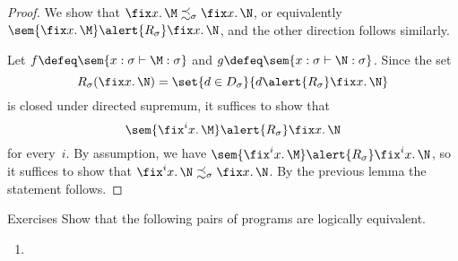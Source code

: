 \begin{frame}
  \begin{proof}
    We show that $\fix x.\, \M \precsim_\sigma \fix x.\, \N$, or
    equivalently~$\sem{\fix x.\, \M} \alert{\mathrel{R_\sigma}} \fix x.\, \N$, and
    the other direction follows similarly. 
    
    Let $f \defeq \sem{x : \sigma \vdash \M : \sigma}$ and $g \defeq \sem{x :
      \sigma \vdash \N : \sigma}$. Since the set
    \[
      R_\sigma(\fix x.\,\N)
      = \set{ d \in D_\sigma}{ d \alert{\mathrel{R_\sigma}} \fix x.\,\N}
    \]
    is closed under directed supremum, it suffices to show that
    \[
      \sem{\fix^i x.\,\M} \alert{\mathrel{R_\sigma}} \fix x.\,\N
    \]
    for every~$i$. By assumption, we
    have $\sem{\fix^i x.\,\M}\alert{\mathrel{R_\sigma}} \fix^i x.\,\N$, so
    it suffices to show that $\fix^i x.\,\N \precsim_\sigma \fix x.\,\N$. By the
    previous lemma the statement follows. 
  \end{proof}
\end{frame}

\begin{frame}{Exercises}
  Show that the following pairs of programs are logically equivalent.
  \begin{enumerate}
    \item 
  \end{enumerate}
\end{frame}


